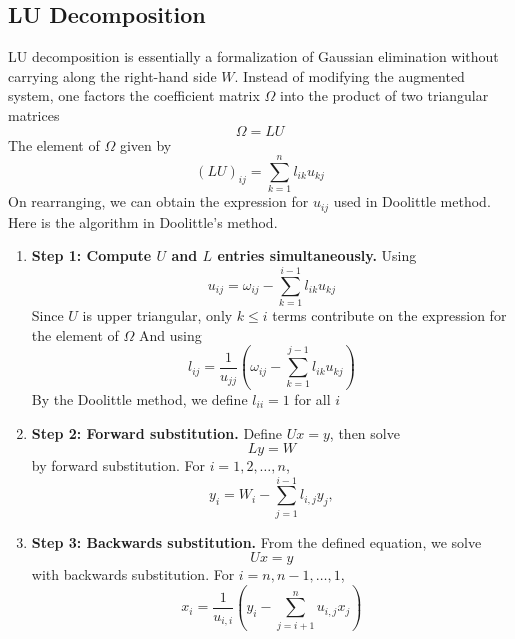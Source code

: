 \documentclass[../../../main.tex]{subfiles}
\begin{document}
\subsection{LU Decomposition}
LU decomposition is essentially a formalization of Gaussian elimination without carrying along the right-hand side $W$.
Instead of modifying the augmented system, one factors the coefficient matrix $\Omega$ into the product of two triangular matrices
\begin{equation*}
    \Omega=LU
\end{equation*}
The element of $\Omega$ given by
\begin{equation*}
    (LU)_{ij}=\sum_{k=1 }^{n}l_{ik}u_{kj}
\end{equation*}
On rearranging, we can obtain the expression for $u_{ij}$ used in Doolittle method.
Here is the algorithm in Doolittle’s method.
\begin{enumerate}
    \item \textbf{Step 1: Compute $U$ and $L$ entries simultaneously.}
          Using
          \begin{equation*}
              u_{ij} = \omega_{ij} - \sum_{k=1}^{i-1} l_{ik} u_{kj}
          \end{equation*}
          Since $U$ is upper triangular, only $k \leq i$ terms contribute on the expression for the element of $\Omega$
          And using
          \begin{equation*}
              l_{ij} = \frac{1}{u_{jj}} \left( \omega_{ij} - \sum_{k=1}^{j-1} l_{ik} u_{kj} \right)
          \end{equation*}
          By the Doolittle method, we define $l_{ii}=1$ for all $i$
    \item \textbf{Step 2: Forward substitution.} Define $Ux=y$, then solve
          \begin{equation*}
              Ly=W
          \end{equation*}
          by forward substitution.
          For $i = 1,2,\ldots,n$,
          \begin{equation*}
              y_i = W_i - \sum_{j=1}^{i-1} l_{i,j} y_j,
          \end{equation*}
    \item \textbf{Step 3: Backwards substitution.} From the defined equation, we solve
          \begin{equation*}
              Ux=y
          \end{equation*}
          with backwards substitution.
          For $i = n, n-1, \ldots, 1$,
          \begin{equation*}
              x_i = \frac{1}{u_{i,i}} \left( y_i - \sum_{j=i+1}^{n} u_{i,j} x_j \right)
          \end{equation*}
\end{enumerate}
\end{document}
